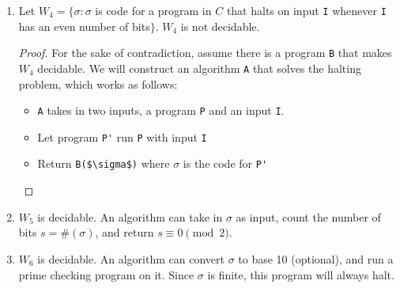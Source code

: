 \documentclass[12pt]{article}
\newcommand{\code}{\lstinline}
\begin{document}
\begin{enumerate}
\begin{proof}
            \begin{itemize}
                \item \code{A} takes in two inputs, a program \code{P} and an input \code{I}
            \end{itemize}
        \end{proof}
        \item Let $W_4=\{\sigma:\sigma$ is code for a program in $C$ that halts on input \code{I} whenever \code{I} has an even number of bits$\}$. $W_4$ is not decidable.
        \begin{proof}
            For the sake of contradiction, assume there is a program \code{B} that makes $W_4$ decidable. We will construct an algorithm \code{A} that solves the halting problem, which works as follows:
            \begin{itemize}
                \item \code{A} takes in two inputs, a program \code{P} and an input \code{I}.
                \item Let program \code{P'} run \code{P} with input \code{I}
                \item Return \code{B($\sigma$)} where $\sigma$ is the code for \code{P'}
            \end{itemize}
        \end{proof}
        \item $W_5$ is decidable. An algorithm can take in $\sigma$ as input, count the number of bits $s=\#(\sigma)$, and return $s\equiv 0\pmod{2}$.
        \item $W_6$ is decidable. An algorithm can convert $\sigma$ to base 10 (optional), and run a prime checking program on it. Since $\sigma$ is finite, this program will always halt.
    \end{enumerate}

    
\end{document}
